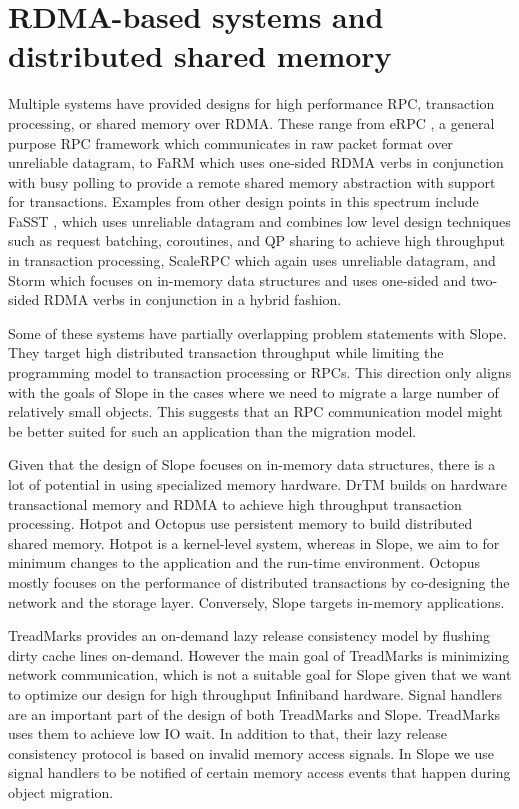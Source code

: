 \section{RDMA-based systems and distributed shared memory}

Multiple systems have provided designs
for high performance RPC, transaction processing, or shared memory over
RDMA. These range from eRPC \cite{kalia2019datacenter}, a general purpose
RPC framework which communicates in raw packet format over unreliable
datagram, to FaRM \cite{Dragojevic2014FaRM} which uses one-sided RDMA
verbs in conjunction with busy polling to provide a remote shared memory
abstraction with support for transactions. Examples from other design
points in this spectrum include FaSST \cite{kalia2016fasst}, which uses
unreliable datagram and combines low level design techniques such as
request batching, coroutines, and QP sharing to achieve high throughput
in transaction processing, ScaleRPC \cite{ScaleRPC2019} which again uses unreliable datagram,
and Storm \cite{novakovic2019storm} which
focuses on in-memory data structures and uses
one-sided and two-sided RDMA verbs in conjunction in a hybrid fashion.

Some of these systems have partially overlapping problem statements with
Slope. They target high distributed transaction throughput while limiting
the programming model to transaction processing or RPCs.
This direction only aligns with the goals of Slope in the cases where we
need to migrate a large number of relatively small objects. This suggests
that an RPC communication model might be better suited for such an
application than the migration model.

Given that the design of Slope focuses on in-memory data structures, there
is a lot of potential in using specialized memory hardware. DrTM
\cite{drtm2017} builds on hardware transactional memory and RDMA
to achieve high throughput transaction processing.
Hotpot \cite{Shan2017distributed} and Octopus \cite{Lu2017rdmadistributed}
use persistent memory to build distributed shared memory. Hotpot is a
kernel-level system, whereas in Slope, we aim to for minimum changes to
the application and the run-time environment.
Octopus mostly focuses on the performance of distributed
transactions by co-designing the network and the storage layer. Conversely,
Slope targets in-memory applications.

TreadMarks \cite{amza1996treadmarks} provides an on-demand lazy release
consistency model by flushing dirty cache lines on-demand. However the main
goal of TreadMarks is minimizing network communication, which is not a
suitable goal for Slope given that we want to optimize our design for high
throughput Infiniband hardware. Signal handlers are an important part of the
design of both TreadMarks and Slope. TreadMarks uses them to achieve low IO
wait. In addition to that, their lazy release consistency protocol is based
on invalid memory access signals. In Slope we use signal handlers to be notified of certain memory access events that happen during object migration.


